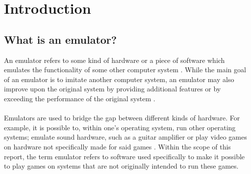 \chapter{Introduction}

\section{What is an emulator?}
An emulator refers to some kind of hardware or a piece of software which emulates the functionality of some other computer system \cite{emulatortechnopedia} \cite{emulatorlifewire}. While the main goal of an emulator is to imitate another computer system, an emulator may also improve upon the original system by providing additional features or by exceeding the performance of the original system \cite{emulatorlifewire}.\\
\\
Emulators are used to bridge the gap between different kinds of hardware. For example, it is possible to, within one's operating system, run other operating systems; emulate sound hardware, such as a guitar amplifier or play video games on hardware not specifically made for said games \cite{emulatorbusinessinsider}. Within the scope of this report, the term emulator refers to software used specifically to make it possible to play games on systems that are not originally intended to run these games.
